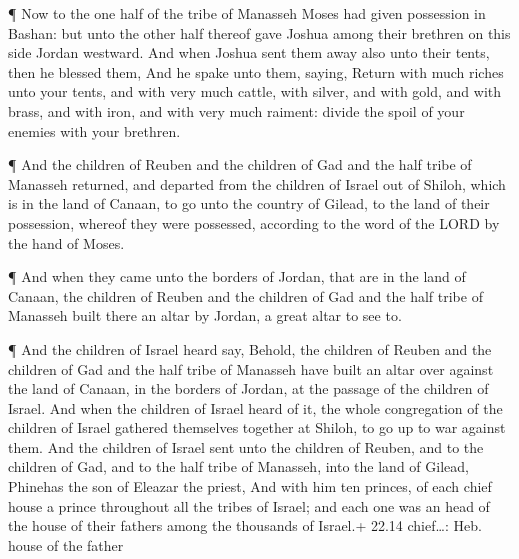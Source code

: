  ¶ Now to the one half of the tribe of Manasseh Moses had
given possession in Bashan: but unto the other half thereof gave Joshua
among their brethren on this side Jordan westward. And when Joshua sent
them away also unto their tents, then he blessed them,  And
he spake unto them, saying, Return with much riches unto your tents, and
with very much cattle, with silver, and with gold, and with brass, and
with iron, and with very much raiment: divide the spoil of your enemies
with your brethren.

 ¶ And the children of Reuben and the children of Gad and
the half tribe of Manasseh returned, and departed from the children of
Israel out of Shiloh, which is in the land of Canaan, to go unto the
country of Gilead, to the land of their possession, whereof they were
possessed, according to the word of the LORD by the hand of Moses.

 ¶ And when they came unto the borders of Jordan, that are
in the land of Canaan, the children of Reuben and the children of Gad
and the half tribe of Manasseh built there an altar by Jordan, a great
altar to see to.

 ¶ And the children of Israel heard say, Behold, the
children of Reuben and the children of Gad and the half tribe of
Manasseh have built an altar over against the land of Canaan, in the
borders of Jordan, at the passage of the children of Israel.
 And when the children of Israel heard of it, the whole
congregation of the children of Israel gathered themselves together at
Shiloh, to go up to war against them.  And the children of
Israel sent unto the children of Reuben, and to the children of Gad, and
to the half tribe of Manasseh, into the land of Gilead, Phinehas the son
of Eleazar the priest,  And with him ten princes, of each
chief house a prince throughout all the tribes of Israel; and each one
was an head of the house of their fathers among the thousands of
Israel.+ 22.14 chief\ldots: Heb. house of the father

